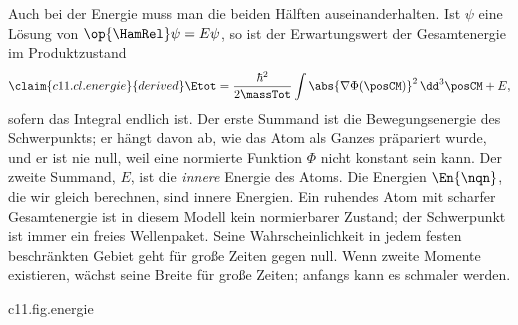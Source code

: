 Auch bei der Energie muss man die beiden Hälften auseinanderhalten. Ist $\psi$ eine
Lösung von $\op{\HamRel}\psi = E\psi$, so ist der Erwartungswert der Gesamtenergie im
Produktzustand
\begin{equation}\label{c11.eq.energie}\claim{c11.cl.energie}{derived}
  \Etot = \frac{\hbar^2}{2\massTot} \int \abs{\nabla\Phi(\posCM)}^2 \,\dd^3\posCM + E ,
\end{equation}
sofern das Integral endlich ist. Der erste Summand ist die Bewegungsenergie des
Schwerpunkts; er hängt davon ab, wie das Atom als Ganzes präpariert wurde, und er ist
nie null, weil eine normierte Funktion $\Phi$ nicht konstant sein kann. Der zweite
Summand, $E$, ist die \emph{innere} Energie des Atoms. Die Energien $\En{\nqn}$, die wir
gleich berechnen, sind innere Energien. Ein ruhendes Atom mit scharfer Gesamtenergie ist
in diesem Modell kein normierbarer Zustand; der Schwerpunkt ist immer ein freies
Wellenpaket. Seine Wahrscheinlichkeit in jedem festen beschränkten Gebiet geht für
große Zeiten gegen null. Wenn zweite Momente existieren, wächst seine Breite für große
Zeiten; anfangs kann es schmaler werden.

\begin{tpcfigure}{c11.fig.energie}
  \caption{Innere Energie und Gesamtenergie nach \eqref{c11.eq.energie}, für $\Znuc = 1$ und in Einheiten der Rydberg-Energie $\RydRed$ aus Abschnitt~\ref{c11.s4}. Die dicken Striche sind die inneren Energien $\En{1}$, $\En{2}$, $\En{3}$ aus Theorem~\ref{c11.thm.spektrum}. Schraffiert ist jeweils der Bereich, in dem der Erwartungswert der Gesamtenergie liegen kann: Er beginnt bei der inneren Energie und hat kein oberes Ende, weil die Bewegungsenergie des Schwerpunkts jeden positiven Wert haben kann.}
\end{tpcfigure}

